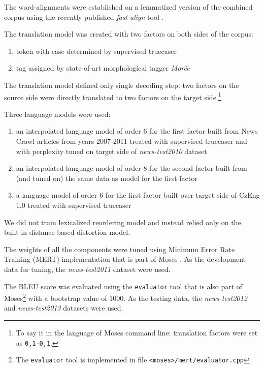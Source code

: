 The word-alignments were established on a lemmatized version of the combined corpus using
the recently published \emph{fast-align} tool \citep{dyer:fastalign}.

The translation model was created with two factors on both sides of the corpus:
\begin{enumerate}
  \item token with case determined by supervised truecaser
  \item tag assigned by state-of-art morphological tagger \emph{Morče}
\end{enumerate}

The translation model defined only single decoding step: two factors on the source side
were directly translated to two factors on the target side.\footnote{To say it in the language
of Moses command line: translation factors were set as \texttt{0,1-0,1}.}

Three language models were used:
\begin{enumerate}
  \item an interpolated language model of order 6 for the first factor built from News Crawl
    articles from years 2007-2011 treated with supervised truecaser and with perplexity tuned
    on target side of \emph{news-test2010} dataset
  \item an interpolated language model of order 8 for the second factor built from (and tuned
    on) the same data as model for the first factor
  \item a language model of order 6 for the first factor built over target side of CzEng 1.0
    treated with supervised truecaser
\end{enumerate}

We did not train lexicalized reordering model and instead relied only on the built-in
distance-based distortion model.

The weights of all the components were tuned using Minimum Error Rate Training (MERT)
implementation that is part of Moses \citep{bertoldi:mert}.
As the development data for tuning, the \emph{news-test2011} dataset were used.

The BLEU score was evaluated using the \texttt{evaluator} tool that is also part of
Moses\footnote{The \texttt{evaluator} tool is implemented in file \texttt{<moses>/mert/evaluator.cpp}}
with a bootstrap value of 1000.
As the testing data, the \emph{news-test2012} and \emph{news-test2013} datasets were used.

